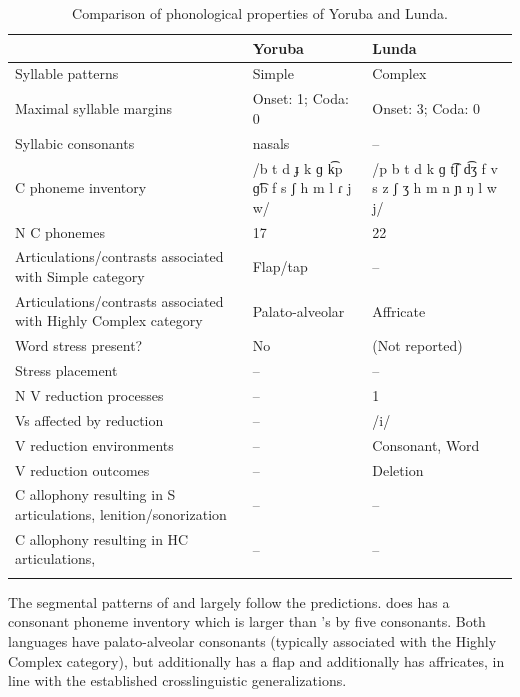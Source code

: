 \begin{table}
\small
\begin{tabularx}{\textwidth}{IQQ}
\lsptoprule
 & {Yoruba} & {Lunda}\\
 \midrule 
 {Syllable patterns} & Simple & Complex\\
 \tablevspace
 {Maximal syllable margins} & Onset: 1; Coda: 0 & Onset: 3; Coda: 0\\
 \tablevspace
 {Syllabic consonants} & nasals & --\\
 \tablevspace
 {C phoneme inventory} & /b t d ɟ k ɡ k͡p ɡ͡b f s ʃ h m l ɾ j w/ & /p b t d k ɡ t͡ʃ d͡ʒ f v s z ʃ ʒ h m n ɲ ŋ l w j/\\
 \tablevspace
 {N C phonemes} & 17 & 22\\
 \tablevspace
 {Articulations/contrasts associated with {Simple}} {category} & {Flap/tap} & {--}\\
 \tablevspace
 {Articulations/contrasts associated with {Highly Complex}} {category} & {Palato-alveolar} & { {Affricate}}\\
 \tablevspace
 {Word stress present?} & {No} & {(Not reported)}\\
 \tablevspace
 {Stress placement} & {--} & {--}\\
 \tablevspace
 {N V reduction processes} & {--} & {1}\\
 \tablevspace
 {Vs affected by reduction}  & {--} & {/i/}\\
 \tablevspace
 {V reduction environments} & {--} & {Consonant, Word}\\
 \tablevspace
 {V reduction outcomes} & {--} & {Deletion}\\
 \tablevspace
 {C allophony resulting in S articulations, lenition/sonorization} & {--} & {--}\\
 \tablevspace
{ {C allophony resulting in HC articulations,} } & {--} & {--}\\
\lspbottomrule
\end{tabularx}
\caption{\label{tab:8.4}Comparison of phonological properties of Yoruba and Lunda.}
\end{table}

  The segmental patterns of  and  largely follow the predictions.  does has a consonant phoneme inventory which is larger than ’s by five consonants. Both languages have palato-alveolar consonants (typically associated with the Highly Complex category), but  additionally has a flap and  additionally has affricates, in line with the established crosslinguistic generalizations.

